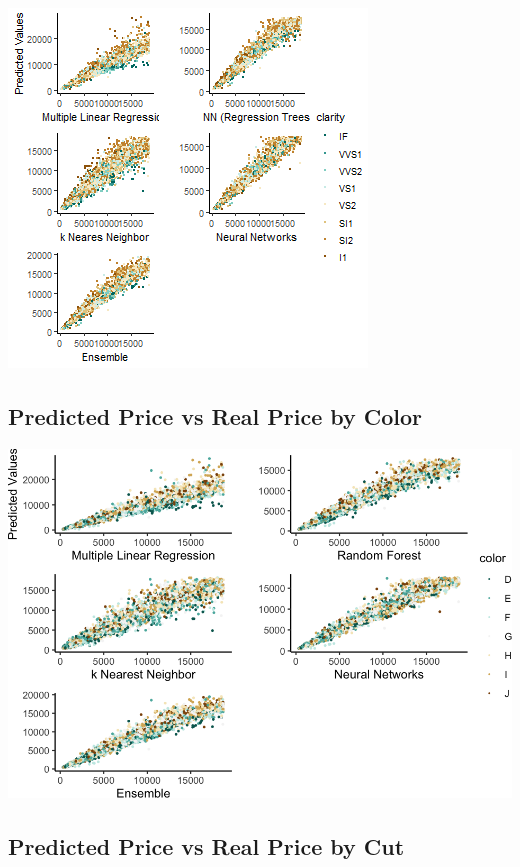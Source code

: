\documentclass[
  paper=a4,
  ,captions=tableheading
]{scrartcl}
\begin{document}
\begin{center}\includegraphics{Diamonds_PDF_files/figure-latex/Ensemble Summary Plot-1} \end{center}

\hypertarget{predicted-price-vs-real-price-by-color}{%
\subsection{Predicted Price vs Real Price by
Color}\label{predicted-price-vs-real-price-by-color}}

\begin{center}\includegraphics{Diamonds_PDF_files/figure-latex/Summ Color Plots-1} \end{center}

\hypertarget{predicted-price-vs-real-price-by-cut}{%
\subsection{Predicted Price vs Real Price by
Cut}\label{predicted-price-vs-real-price-by-cut}}
\end{document}
